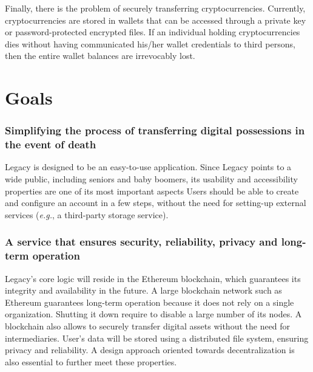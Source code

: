Finally, there is the problem of securely transferring cryptocurrencies. Currently, cryptocurrencies are stored in wallets that can be accessed through a private key or password-protected encrypted files. If an individual holding cryptocurrencies dies without having communicated his/her wallet credentials to third persons, then the entire wallet balances are irrevocably lost. 


\section{Goals} %
\label{sec:goals}

\subsubsection*{Simplifying the process of transferring digital possessions in the event of death} %
\label{ssub:simplifying_the_process_of_transferring_your_digital_possessions_after_your_death}
Legacy is designed to be an easy-to-use application. 
Since Legacy points to a wide public, including seniors and baby boomers, its usability and accessibility properties are one of its most important aspects
Users should be able to create and configure an account in a few steps, without the need for setting-up external services (\textit{e.g.}, a third-party storage service). 

\subsubsection*{A service that ensures security, reliability, privacy and long-term operation} %
\label{ssub:a_service_that_ensures_security_reliability_privacy_and_long_term_operation}
Legacy's core logic will reside in the Ethereum blockchain, which guarantees its integrity and availability in the future. 
A large blockchain network such as Ethereum guarantees long-term operation because it does not rely on a single organization. Shutting it down require to disable a large number of its nodes.
A blockchain also allows to securely transfer digital assets without the need for intermediaries.
User's data will be stored using a distributed file system, ensuring privacy and reliability.
A design approach oriented towards decentralization is also essential to further meet these properties.

